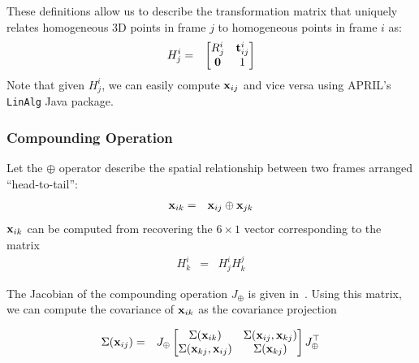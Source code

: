 \documentclass[conference]{IEEEtran}
\begin{document}
These definitions allow us to describe the transformation matrix
that uniquely relates homogeneous 3D points in frame $j$ to homogeneous
points in frame $i$ as:
\begin{eqnarray*}
  H_{j}^i & = & \begin{bmatrix}
    R_j^i & {\bf t}_{ij}^i\\
    {\bf 0} & 1
  \end{bmatrix}
\end{eqnarray*}
Note that given $H_j^i$, we can easily compute ${\bf x}_{ij}$ and vice
versa using APRIL's \texttt{LinAlg} Java package.

\subsubsection{Compounding Operation}
\label{sub:compoundingoperation}

Let the $\oplus$ operator describe the spatial relationship between
two frames arranged ``head-to-tail'':
\begin{eqnarray*}
  {\bf x}_{ik} & = & {\bf x}_{ij} \oplus {\bf x}_{jk} 
\end{eqnarray*}
${\bf x}_{ik}$ can be computed from recovering the $6 \times 1$ vector
corresponding to the matrix
\begin{eqnarray*}
  H_k^i & = & H_j^i H_k^j
\end{eqnarray*}


The Jacobian of the compounding operation $J_\oplus$ is given
in~\cite{reustice-phdthesis}.  Using this matrix, we can compute the covariance of ${\bf
  x}_{ik}$ as the covariance projection

\begin{eqnarray*}
  \Sigma({\bf x}_{ij}) & = & J_\oplus \begin{bmatrix}
    \Sigma({\bf x}_{ik}) & \Sigma({\bf x}_{ij}, {\bf x}_{kj})\\
    \Sigma({\bf x}_{kj}, {\bf x}_{ij}) & \Sigma({\bf x}_{kj})\\
  \end{bmatrix} J_\oplus^\top
\end{eqnarray*}
\end{document}

